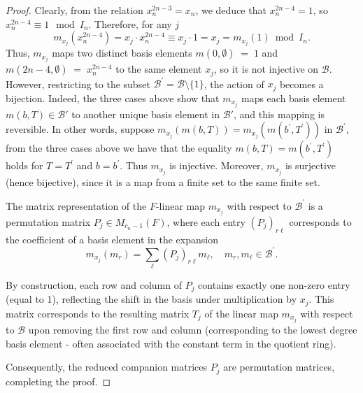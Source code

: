\documentclass[11pt]{amsart}
\theoremstyle{plain}
\theoremstyle{definition}
\theoremstyle{remark}
\begin{document}
\begin{proof}
	Clearly, from the relation \( x_n^{2n-3} = x_n \), we deduce that \( x_n^{2n-4} = 1 \), so \( x_n^{2n-4} \equiv 1 \mod I_n \). Therefore, for any \( j \)
	\[
	m_{x_j}(x_n^{2n-4}) = x_j \cdot x_n^{2n-4} \equiv x_j \cdot 1 = x_j  = m_{x_j}(1) \bmod{ I_n}.
	\]
	Thus, \( m_{x_j} \) maps two distinct basis elements \( m(0,\emptyset) \;=\; 1 \) and \( m(2n-4,\emptyset) \;=\;x_n^{2n-4} \) to the same element \( x_j \), so it is not injective on \( \mathcal{B} \). However, restricting to the subset \(\mathcal{B}^{\prime}=\mathcal{B}\setminus \{1\} \), the action of \( x_j \) becomes a bijection. Indeed, the three cases above show that \( m_{x_j} \) maps each basis element \( m(b, T) \in \mathcal{B}' \) to another unique basis element in \( \mathcal{B}' \), and this mapping is reversible. In other words, suppose \( m_{x_j}(m(b,T)) =  m_{x_j}(m(b^{\prime},T^{\prime}))\) in \( \mathcal{B}^{\prime} \), from the three cases above we have that the equality \( m(b,T) = m(b^{\prime},T^{\prime}) \) holds for \( T = T^{\prime} \) and \( b = b^{\prime}\). Thus \( m_{x_j}\) is injective. Moreover, \( m_{x_j}\) is surjective (hence bijective), since it is a map from a finite set to the same finite set.
	
	The  matrix representation of the \( F\)-linear map \(m_{x_j}\) with respect to \(\mathcal{B}^{\prime}\) is a permutation matrix \(P_j \in M_{c_n-1}(F)\), where each entry \( (P_j)_{r\ell} \) corresponds to the coefficient of a basis element in the expansion \[
	m_{x_j}(m_r) = \sum_{\ell} (P_j)_{r\ell} m_\ell, \quad m_r, m_\ell \in \mathcal{B}^{\prime}.
	\]	
	
	By construction, each row and column of \( P_j \) contains exactly one non-zero entry (equal to 1), reflecting the shift in the basis under multiplication by \( x_j \). This matrix corresponds to the resulting matrix \( T_j\) of the linear map \( m_{x_j}\) with respect to \( \mathcal{B} \) upon removing the first row and column (corresponding to the lowest degree basis element - often associated with the constant term in the quotient ring).
	
	Consequently, the reduced companion matrices \( P_j \) are permutation matrices, completing the proof.
\end{proof}
\end{document}
